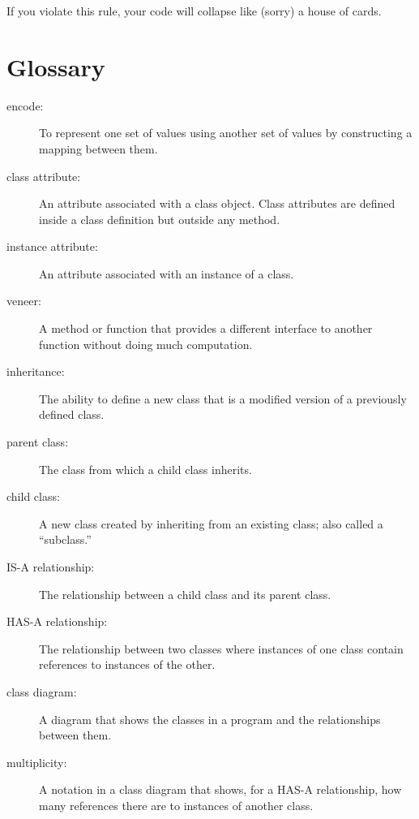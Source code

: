 If you violate this rule, your code will collapse like (sorry)
a house of cards.


\section{Glossary}

\begin{description}

\item[encode:]  To represent one set of values using another
set of values by constructing a mapping between them.

\item[class attribute:] An attribute associated with a class
object.  Class attributes are defined inside
a class definition but outside any method.

\item[instance attribute:] An attribute associated with an
instance of a class.

\item[veneer:] A method or function that provides a different
interface to another function without doing much computation.

\item[inheritance:] The ability to define a new class that is a
modified version of a previously defined class.

\item[parent class:] The class from which a child class inherits.

\item[child class:] A new class created by inheriting from an
existing class; also called a ``subclass.''

\item[IS-A relationship:] The relationship between a child class
and its parent class.

\item[HAS-A relationship:] The relationship between two classes
where instances of one class contain references to instances of
the other.

\item[class diagram:] A diagram that shows the classes in a program
and the relationships between them.

\item[multiplicity:] A notation in a class diagram that shows, for
a HAS-A relationship, how many references there are to instances
of another class.

\end{description}


